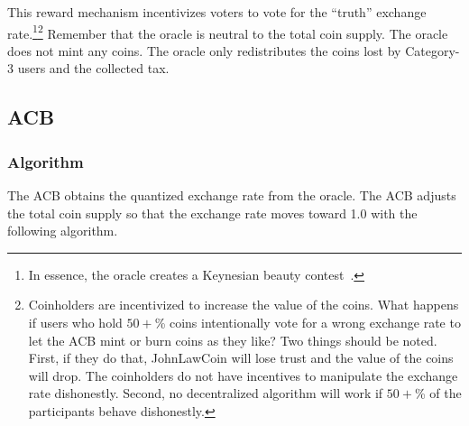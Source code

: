 \documentclass[dvipdfmx,a4paper]{article}
\begin{document}
This reward mechanism incentivizes voters to vote for the ``truth'' exchange rate.\footnote{In essence, the oracle creates a Keynesian beauty contest~\cite{gao2008keynesian}.}\footnote{Coinholders are incentivized to increase the value of the coins. What happens if users who hold $50+$\% coins intentionally vote for a wrong exchange rate to let the ACB mint or burn coins as they like? Two things should be noted. First, if they do that, JohnLawCoin will lose trust and the value of the coins will drop. The coinholders do not have incentives to manipulate the exchange rate dishonestly. Second, no decentralized algorithm will work if $50+$\% of the participants behave dishonestly.} Remember that the oracle is neutral to the total coin supply. The oracle does not mint any coins. The oracle only redistributes the coins lost by Category-3 users and the collected tax.

\subsection{ACB}

\subsubsection{Algorithm}

The ACB obtains the quantized exchange rate from the oracle. The ACB adjusts the total coin supply so that the exchange rate moves toward 1.0 with the following algorithm.
\end{document}
